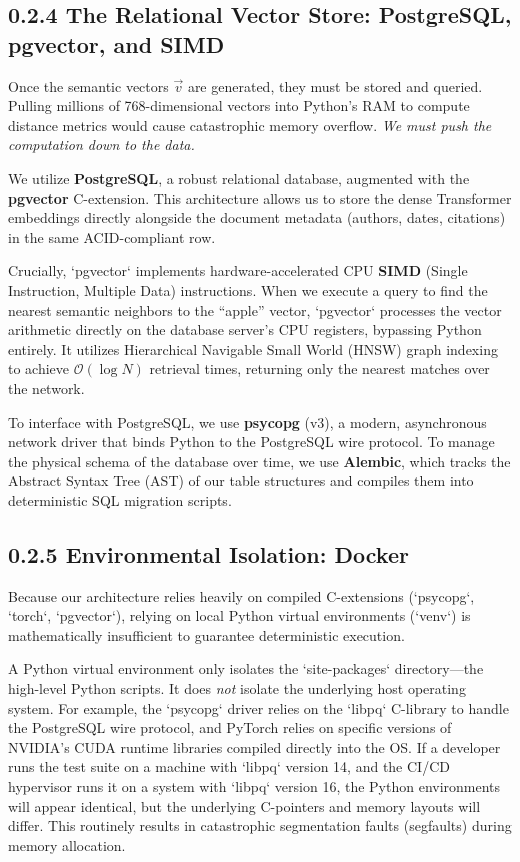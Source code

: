 \subsection*{0.2.4 The Relational Vector Store: PostgreSQL, pgvector, and SIMD}

Once the semantic vectors $\vec{v}$ are generated, they must be stored and queried. Pulling millions of 768-dimensional vectors into Python's RAM to compute distance metrics would cause catastrophic memory overflow. \textit{We must push the computation down to the data.}

We utilize \textbf{PostgreSQL}, a robust relational database, augmented with the \textbf{pgvector} C-extension. This architecture allows us to store the dense Transformer embeddings directly alongside the document metadata (authors, dates, citations) in the same ACID-compliant row.

Crucially, `pgvector` implements hardware-accelerated CPU \textbf{SIMD} (Single Instruction, Multiple Data) instructions. When we execute a query to find the nearest semantic neighbors to the ``apple'' vector, `pgvector` processes the vector arithmetic directly on the database server's CPU registers, bypassing Python entirely. It utilizes Hierarchical Navigable Small World (HNSW) graph indexing to achieve $\mathcal{O}(\log N)$ retrieval times, returning only the nearest matches over the network.

To interface with PostgreSQL, we use \textbf{psycopg} (v3), a modern, asynchronous network driver that binds Python to the PostgreSQL wire protocol. To manage the physical schema of the database over time, we use \textbf{Alembic}, which tracks the Abstract Syntax Tree (AST) of our table structures and compiles them into deterministic SQL migration scripts.




\subsection*{0.2.5 Environmental Isolation: Docker}


Because our architecture relies heavily on compiled C-extensions (`psycopg`, `torch`, `pgvector`), relying on local Python virtual environments (`venv`) is mathematically insufficient to guarantee deterministic execution.

A Python virtual environment only isolates the `site-packages` directory—the high-level Python scripts. It does \textit{not} isolate the underlying host operating system. For example, the `psycopg` driver relies on the `libpq` C-library to handle the PostgreSQL wire protocol, and PyTorch relies on specific versions of NVIDIA's CUDA runtime libraries compiled directly into the OS. If a developer runs the test suite on a machine with `libpq` version 14, and the CI/CD hypervisor runs it on a system with `libpq` version 16, the Python environments will appear identical, but the underlying C-pointers and memory layouts will differ. This routinely results in catastrophic segmentation faults (segfaults) during memory allocation.

